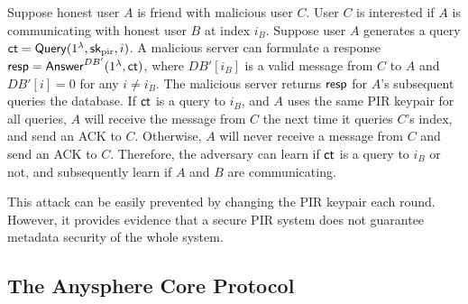 Suppose honest user $A$ is friend with malicious user $C$. User $C$ is interested if $A$ is communicating with honest user $B$ at index $i_B$. Suppose user $A$ generates a query $\mathsf{ct} = \mathsf{Query}(1^{\lambda}, {\mathsf{sk}}_{\text{pir}}, i)$. A malicious server can formulate a response $\mathsf{resp} = \mathsf{Answer}^{DB'}(1^{\lambda}, \mathsf{ct})$, where $DB'[i_B]$ is a valid message from $C$ to $A$ and $DB'[i] = 0$ for any $i \neq i_B$. The malicious server returns $\mathsf{resp}$ for $A$'s subsequent queries the database. If $\mathsf{ct}$ is a query to $i_B$, and $A$ uses the same PIR keypair for all queries, $A$ will receive the message from $C$ the next time it queries $C$'s index, and send an ACK to $C$. Otherwise, $A$ will never receive a message from $C$ and send an ACK to $C$. Therefore, the adversary can learn if $\mathsf{ct}$ is a query to $i_B$ or not, and subsequently learn if $A$ and $B$ are communicating.

This attack can be easily prevented by changing the PIR keypair each round. However, it provides evidence that a secure PIR system does not guarantee metadata security of the whole system.
\subsection{The Anysphere Core Protocol}


